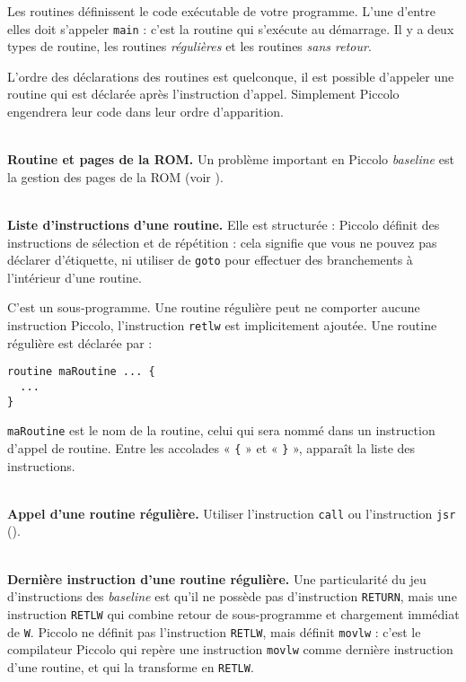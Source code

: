 
Les routines définissent le code exécutable de votre programme. L’une d’entre elles doit s’appeler \texttt{main} : c’est la routine qui s’exécute au démarrage. Il y a deux types de routine, les routines \emph{régulières} et les routines \emph{sans retour}.


L’ordre des déclarations des routines est quelconque, il est possible d’appeler une routine qui est déclarée après l’instruction d’appel. Simplement Piccolo engendrera leur code dans leur ordre d’apparition. 

~\\
\textbf{Routine et pages de la ROM.} Un problème important en Piccolo \emph{baseline} est la gestion des pages de la ROM (voir ).

~\\
\textbf{Liste d’instructions d’une routine.} Elle est structurée : Piccolo définit des instructions de sélection et de répétition : cela signifie que vous ne pouvez pas déclarer d’étiquette, ni utiliser de \texttt{goto} pour effectuer des branchements à l’intérieur d’une routine.



C'est un sous-programme. Une routine régulière peut ne comporter aucune instruction Piccolo, l'instruction \texttt{retlw} est implicitement ajoutée. Une routine régulière est déclarée par :
\begin{lstlisting}[language=piccolo]
routine maRoutine ... {
  ...
}
\end{lstlisting}

\texttt{maRoutine} est le nom de la routine, celui qui sera nommé dans un instruction d’appel de routine. Entre les accolades « \texttt{\{} » et « \texttt{\}} », apparaît la liste des instructions.

~\\
\textbf{Appel d’une routine régulière.} Utiliser l'instruction \texttt{call} ou l'instruction \texttt{jsr} ().

~\\
\textbf{Dernière instruction d’une routine régulière.} Une particularité du jeu d'instructions des \emph{baseline} est qu'il ne possède pas d'instruction \texttt{RETURN}, mais une instruction \texttt{RETLW} qui combine retour de sous-programme et chargement immédiat de \texttt{W}. Piccolo ne définit pas l'instruction \texttt{RETLW}, mais définit \texttt{movlw} : c'est le compilateur Piccolo qui repère une instruction \texttt{movlw} comme dernière instruction d'une routine, et qui la transforme en \texttt{RETLW}.

